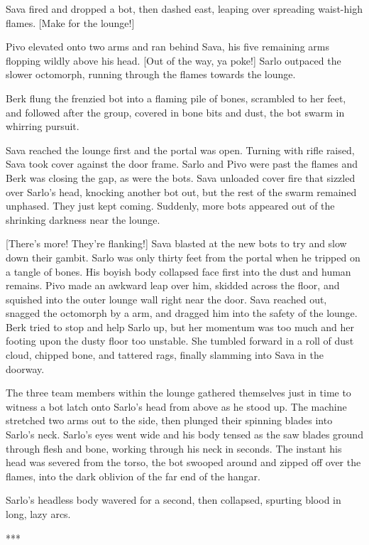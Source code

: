 Sava fired and dropped a bot, then dashed east, leaping over spreading waist-high flames. [Make for the lounge!]

Pivo elevated onto two arms and ran behind Sava, his five remaining arms flopping wildly above his head. [Out of the way, ya poke!] Sarlo outpaced the slower octomorph, running through the flames towards the lounge.

Berk flung the frenzied bot into a flaming pile of bones, scrambled to her feet, and followed after the group, covered in bone bits and dust, the bot swarm in whirring pursuit.

Sava reached the lounge first and the portal was open. Turning with rifle raised, Sava took cover against the door frame. Sarlo and Pivo were past the flames and Berk was closing the gap, as were the bots. Sava unloaded cover fire that sizzled over Sarlo's head, knocking another bot out, but the rest of the swarm remained unphased. They just kept coming. Suddenly, more bots appeared out of the shrinking darkness near the lounge.

[There's more! They're flanking!] Sava blasted at the new bots to try and slow down their gambit. Sarlo was only thirty feet from the portal when he tripped on a tangle of bones. His boyish body collapsed face first into the dust and human remains. Pivo made an awkward leap over him, skidded across the floor, and squished into the outer lounge wall right near the door. Sava reached out, snagged the octomorph by a arm, and dragged him into the safety of the lounge. Berk tried to stop and help Sarlo up, but her momentum was too much and her footing upon the dusty floor too unstable. She tumbled forward in a roll of dust cloud, chipped bone, and tattered rags, finally slamming into Sava in the doorway.

The three team members within the lounge gathered themselves just in time to witness a bot latch onto Sarlo's head from above as he stood up. The machine stretched two arms out to the side, then plunged their spinning blades into Sarlo's neck. Sarlo's eyes went wide and his body tensed as the saw blades ground through flesh and bone, working through his neck in seconds. The instant his head was severed from the torso, the bot swooped around and zipped off over the flames, into the dark oblivion of the far end of the hangar.

Sarlo's headless body wavered for a second, then collapsed, spurting blood in long, lazy arcs.

\begin{center} *** \end{center}

